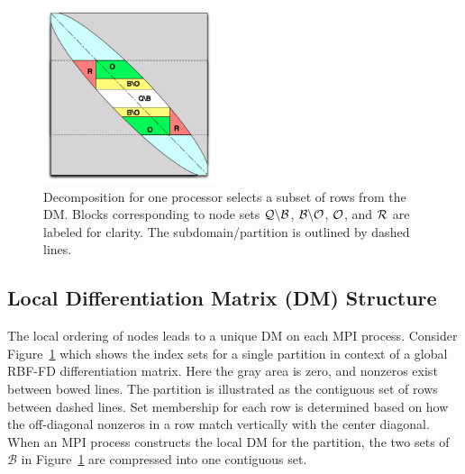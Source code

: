 \documentclass{report}
\begin{document}
\begin{figure}
\begin{center}
\includegraphics[width=0.45\textwidth]{rbffd_methods_content/decompositions/MatrixDecompositionSets_RBF-FD_Bowed.pdf} 
\caption{Decomposition for one processor selects a subset of rows from the DM. Blocks corresponding to node sets $\mathcal{Q} \backslash \mathcal{B}$, $\mathcal{B} \backslash \mathcal{O}$, $\mathcal{O}$, and $\mathcal{R}$ are labeled for clarity. The subdomain/partition is outlined by dashed lines.}
\label{fig:decomp_matrix_view}
\end{center}
\end{figure}

\subsection{Local Differentiation Matrix (DM) Structure}

The local ordering of nodes leads to a unique DM on each MPI process. Consider Figure~\ref{fig:decomp_matrix_view} which shows the index sets for a single partition in context of a global RBF-FD differentiation matrix. Here the gray area is zero, and nonzeros exist between bowed lines. The partition is illustrated as the contiguous set of rows between dashed lines. Set membership for each row is determined based on how the off-diagonal nonzeros in a row match vertically with the center diagonal. When an MPI process constructs the local DM for the partition, the two sets of $\mathcal{B}$ in Figure~\ref{fig:decomp_matrix_view} are compressed into one contiguous set. %
\end{document}

